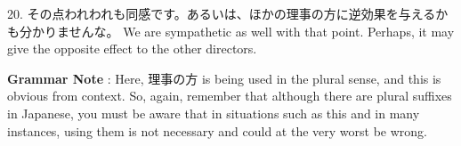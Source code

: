 \par{20. その点われわれも同感です。あるいは、ほかの理事の方に逆効果を与えるかも分かりませんな。 \hfill\break
We are sympathetic as well with that point. Perhaps, it may give the opposite effect to the other directors. }

\par{\textbf{Grammar Note }: Here, 理事の方 is being used in the plural sense, and this is obvious from context. So, again, remember that although there are plural suffixes in Japanese, you must be aware that in situations such as this and in many instances, using them is not necessary and could at the very worst be wrong. }
    